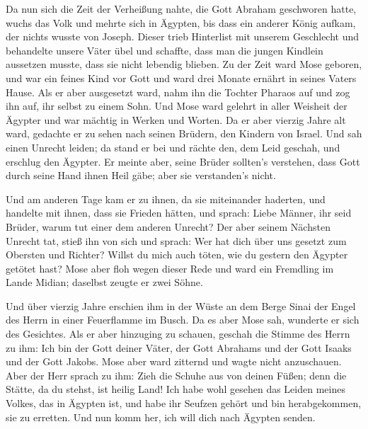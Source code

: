  Da nun sich die Zeit der Verheißung nahte, die Gott
Abraham geschworen hatte, wuchs das Volk und mehrte sich in Ägypten,
 bis dass ein anderer König aufkam, der nichts wusste von
Joseph.  Dieser trieb Hinterlist mit unserem Geschlecht
und behandelte unsere Väter übel und schaffte, dass man die jungen
Kindlein aussetzen musste, dass sie nicht lebendig blieben.
 Zu der Zeit ward Mose geboren, und war ein feines Kind
vor Gott und ward drei Monate ernährt in seines Vaters Hause.
 Als er aber ausgesetzt ward, nahm ihn die Tochter
Pharaos auf und zog ihn auf, ihr selbst zu einem Sohn. 
Und Mose ward gelehrt in aller Weisheit der Ägypter und war mächtig in
Werken und Worten.  Da er aber vierzig Jahre alt ward,
gedachte er zu sehen nach seinen Brüdern, den Kindern von Israel.
 Und sah einen Unrecht leiden; da stand er bei und rächte
den, dem Leid geschah, und erschlug den Ägypter.  Er
meinte aber, seine Brüder sollten's verstehen, dass Gott durch seine
Hand ihnen Heil gäbe; aber sie verstanden's nicht.

 Und am anderen Tage kam er zu ihnen, da sie miteinander
haderten, und handelte mit ihnen, dass sie Frieden hätten, und sprach:
Liebe Männer, ihr seid Brüder, warum tut einer dem anderen Unrecht?
 Der aber seinem Nächsten Unrecht tat, stieß ihn von sich
und sprach: Wer hat dich über uns gesetzt zum Obersten und Richter?
 Willst du mich auch töten, wie du gestern den Ägypter
getötet hast?  Mose aber floh wegen dieser Rede und ward
ein Fremdling im Lande Midian; daselbst zeugte er zwei Söhne.

 Und über vierzig Jahre erschien ihm in der Wüste an dem
Berge Sinai der Engel des Herrn in einer Feuerflamme im Busch.
 Da es aber Mose sah, wunderte er sich des Gesichtes. Als
er aber hinzuging zu schauen, geschah die Stimme des Herrn zu ihm:
 Ich bin der Gott deiner Väter, der Gott Abrahams und der
Gott Isaaks und der Gott Jakobs. Mose aber ward zitternd und wagte nicht
anzuschauen.  Aber der Herr sprach zu ihm: Zieh die
Schuhe aus von deinen Füßen; denn die Stätte, da du stehst, ist heilig
Land!  Ich habe wohl gesehen das Leiden meines Volkes,
das in Ägypten ist, und habe ihr Seufzen gehört und bin herabgekommen,
sie zu erretten. Und nun komm her, ich will dich nach Ägypten senden.

